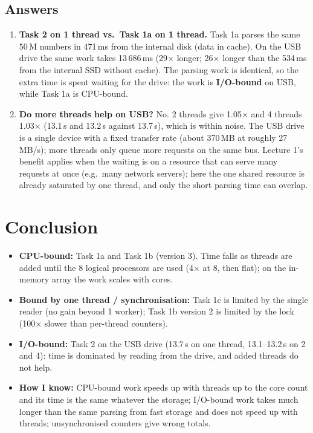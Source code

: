 \documentclass[12pt,a4paper]{article}
\begin{document}
\subsection{Answers}
\begin{enumerate}
  \item \textbf{Task 2 on 1 thread vs.\ Task 1a on 1 thread.} Task 1a parses
        the same 50\,M numbers in 471\,ms from the internal disk (data in cache). On the USB
        drive the same work takes 13\,686\,ms (29$\times$ longer; 26$\times$ longer than the 534\,ms from the internal SSD without cache). The parsing
        work is identical, so the extra time is spent waiting for the drive: the
        work is \textbf{I/O-bound} on USB, while Task 1a is CPU-bound.
  \item \textbf{Do more threads help on USB?} No. 2 threads give 1.05$\times$ and 4 threads 1.03$\times$ (13.1\,s and 13.2\,s against 13.7\,s), which is within noise. The USB drive is a single device with a fixed transfer rate
        (about 370\,MB at roughly 27\,MB/s); more threads only
        queue more requests on the same bus. Lecture 1's benefit applies when the
        waiting is on a resource that can serve many requests at once (e.g.\ many
        network servers); here the one shared resource is already saturated by
        one thread, and only the short parsing time can overlap.
\end{enumerate}

\section{Conclusion}

\begin{itemize}
  \item \textbf{CPU-bound:} Task 1a and Task 1b (version 3). Time falls as threads are
        added until the 8 logical processors are used (4$\times$ at 8, then
        flat); on the in-memory array the work scales with cores.
  \item \textbf{Bound by one thread / synchronisation:} Task 1c is limited by
        the single reader (no gain beyond 1 worker); Task 1b version 2 is
        limited by the lock (100$\times$ slower than per-thread counters).
  \item \textbf{I/O-bound:} Task 2 on the USB drive (13.7\,s on one thread, 13.1--13.2\,s on 2 and 4): time is dominated by reading from the drive, and added
        threads do not help.
  \item \textbf{How I know:} CPU-bound work speeds up with threads up to the
        core count and its time is the same whatever the storage; I/O-bound
        work takes much longer than the same parsing from fast storage and does not
        speed up with threads; unsynchronised counters give wrong totals.
\end{itemize}
\end{document}
